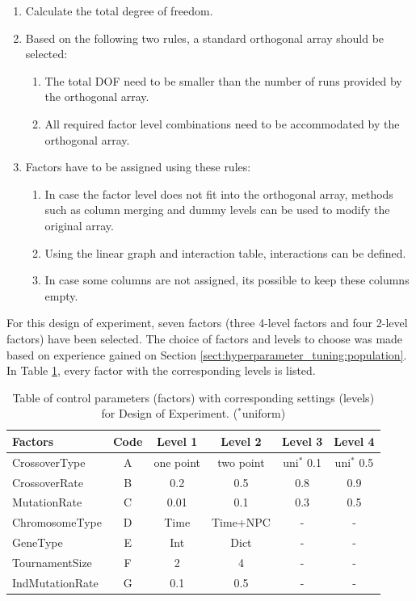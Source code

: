 \begin{enumerate}
	\item Calculate the total degree of freedom. 
	\item Based on the following two rules, a standard orthogonal array should be selected:
	\begin{enumerate}
		\item The total DOF need to be smaller than the number of runs provided by the orthogonal array.
		\item All required factor level combinations need to be accommodated by the orthogonal array.
	\end{enumerate}
	
	\item Factors have to be assigned using these rules: 
	\begin{enumerate}
		\item In case the factor level does not fit into the orthogonal array, methods such as column merging and dummy levels can be used to modify the original array.
		\item Using the linear graph and interaction table, interactions can be defined. 
		\item In case some columns are not assigned, its possible to keep these columns empty.
	\end{enumerate}
\end{enumerate}

For this design of experiment, seven factors (three 4-level factors and four 2-level factors) have been selected. The choice of factors and levels to choose was made based on experience gained on Section \ref{sect:hyperparameter_tuning:population}. In Table \ref{tab:hyperparameter_tuning:settings_to_level}, every factor with the corresponding levels is listed.

\begin{table}[ht]
	\centering
	\small
	\begin{tabular}{ l|c|cccc }
		\hline
		Factors & Code & Level 1 & Level 2 & Level 3 & Level 4\\
		\hline
		CrossoverType 		& A & one point & two point & uni$^*$ 0.1 & uni$^*$ 0.5\\
		CrossoverRate    	& B & 0.2 & 0.5 & 0.8 & 0.9\\
		MutationRate   		& C & 0.01 & 0.1 & 0.3 & 0.5\\
		ChromosomeType   	& D & Time & Time+NPC & - & -\\
		GeneType			& E & Int & Dict & - & -\\
		TournamentSize 		& F & 2 & 4 & - & -\\
		IndMutationRate		& G & 0.1 & 0.5 & - & -\\
		\hline
	\end{tabular}
\caption{Table of control parameters (factors) with corresponding settings (levels) for Design of Experiment. ($^*$uniform)}
\label{tab:hyperparameter_tuning:settings_to_level}
\end{table}

